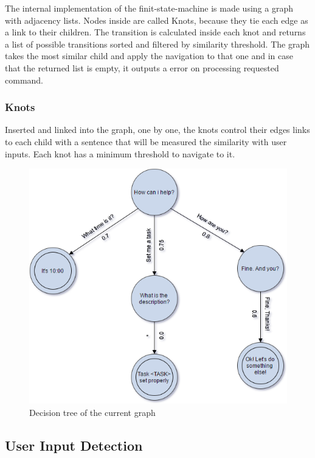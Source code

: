 \documentclass[
	article,			%
	11pt,				%
	oneside,			%
	a4paper,			%
	english,			%
	english,				%
	]{abntex2}
\begin{document}
The internal implementation of the finit-state-machine is made using a graph with adjacency lists.
Nodes inside are called Knots, because they tie each edge as a link to their children. The transition
is calculated inside each knot and returns a list of possible transitions sorted and filtered by
similarity threshold. The graph takes the most similar child and apply the navigation to that
one and in case that the returned list is empty, it outputs a error on processing requested command.

\subsubsection{Knots}

Inserted and linked into the graph, one by one, the knots control their edges links to each child with a 
sentence that will be measured the similarity with user inputs. Each knot has a minimum threshold to
navigate to it.

\begin{figure}[H]
    \caption[english]{Decision tree of the current graph}
    \centering
    \includegraphics[width=\textwidth]{DecisionTree}
\end{figure}

\subsection{User Input Detection}
\end{document}

